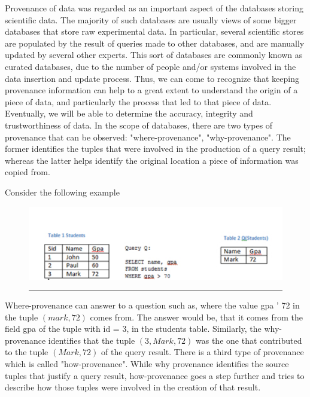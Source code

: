 Provenance of data was regarded as an important aspect of the databases storing scientific data. The majority of such databases are usually views of some bigger databases that store raw experimental data. In particular, several scientific stores are populated by the result of queries made to other databases, and are manually updated by several other experts. This sort of databases are commonly known as curated databases\cite{reference1:53}, due to the number of people and/or systems involved in the data insertion and update process. Thus, we can come to recognize that keeping provenance information can help to a great extent to understand the origin of a piece of data, and particularly the process that led to that piece of data. Eventually, we will be able to determine the accuracy, integrity and trustworthiness of data\cite{reference3}.
In the scope of databases, there are two types of provenance that can be observed: "where-provenance", "why-provenance"\cite{reference3:7}. The former identifies the tuples that were involved in the production of a query result; whereas the latter helps identify the original location a piece of information was copied from.

Consider the following example

\begin{figure}[htbp]
	\centering
		\includegraphics{./Figures/table.pdf}
		\rule{35em}{0.5pt}
	\label{fig:scientificWorkflow}
\end{figure}


Where-provenance can answer to a question such as, where the value gpa ' 72 in the tuple $(mark, 72)$ comes from. The answer would be, that it comes from the field gpa of the tuple with id = 3, in the students table.  Similarly, the why-provenance identifies that the tuple $(3, Mark, 72)$ was the one that contributed to the tuple $(Mark, 72)$ of the query result.
There is a third type of provenance which is called "how-provenance"\cite{reference1:188}. While why provenance identifies the source tuples that justify a query result, how-provenance goes a step further and tries to describe how those tuples were involved in the creation of that result.

